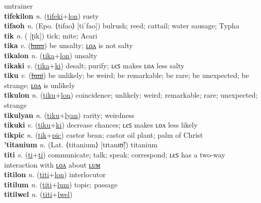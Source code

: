untrainer \label{tifekiles} \\
\textbf{tifekilon} \textit{n.} (\hyperref[tifeki]{tifeki}+\hyperref[lon]{lon})
rusty \label{tifekilon} \\
\textbf{tifaoh} \textit{n.} (Epo. ⟨tifao⟩ [tiˈfao])
bulrush; reed; cattail; water sausage; Typha \label{tifaoh} \\
\textbf{tik} \textit{n.} ( [ʈik])
tick; mite; Acari \label{tik} \\
\textbf{tika} \textit{v.} (\hyperref[luna]{\sout{luna}})
be unsalty; \hyperref[tikalon]{ʟᴏᴧ} is not salty \label{tika} \\
\textbf{tikalon} \textit{n.} (\hyperref[tika]{tika}+\hyperref[lon]{lon})
unsalty \label{tikalon} \\
\textbf{tikaki} \textit{v.} (\hyperref[tika]{tika}+\hyperref[ki]{ki})
desalt; purify; ʟєꜱ makes ʟᴏᴧ less salty \label{tikaki} \\
\textbf{tiku} \textit{v.} (\hyperref[luni]{\sout{luni}})
be unlikely; be weird; be remarkable; be rare; be unexpected; be strange; \hyperref[tikulon]{ʟᴏᴧ} is unlikely \label{tiku} \\
\textbf{tikulon} \textit{n.} (\hyperref[tiku]{tiku}+\hyperref[lon]{lon})
coincidence; unlikely; weird; remarkable; rare; unexpected; strange \label{tikulon} \\
\textbf{tikulyan} \textit{n.} (\hyperref[tiku]{tiku}+\hyperref[lyan]{lyan})
rarity; weirdness \label{tikulyan} \\
\textbf{tikuki} \textit{v.} (\hyperref[tiku]{tiku}+\hyperref[ki]{ki})
decrease chances; ʟєꜱ makes ʟᴏᴧ less likely \label{tikuki} \\
\textbf{tikpic} \textit{n.} (\hyperref[tik]{tik}+\hyperref[pic]{pic})
castor bean; castor oil plant; palm of Christ \label{tikpic} \\
\textbf{'titanium} \textit{n.} (Lat. ⟨titanium⟩ [tɪtanɪʊ̃])
titanium \label{'titanium} \\
\textbf{titi} \textit{v.} (\hyperref[ti]{ti}+\hyperref[ti]{ti})
communicate; talk; speak; correspond; ʟєꜱ has a two-way interaction with \hyperref[titilon]{ʟᴏᴧ} about \hyperref[titilum]{ʟᴜᴍ} \label{titi} \\
\textbf{titilon} \textit{n.} (\hyperref[titi]{titi}+\hyperref[lon]{lon})
interlocutor \label{titilon} \\
\textbf{titilum} \textit{n.} (\hyperref[titi]{titi}+\hyperref[lum]{lum})
topic; passage \label{titilum} \\
\textbf{titilwel} \textit{n.} (\hyperref[titi]{titi}+\hyperref[lwel]{lwel})
